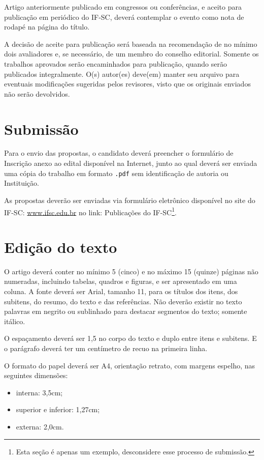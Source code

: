 \documentclass[12pt]{article}
\begin{document}
Artigo anteriormente publicado em congressos ou conferências, e aceito para publicação em periódico do IF-SC, deverá contemplar o evento como nota de rodapé na página do título. 

A decisão de aceite para publicação será baseada na recomendação de no mínimo dois avaliadores e, se necessário, de um membro do conselho editorial. Somente os trabalhos aprovados serão encaminhados para publicação, quando serão publicados integralmente. O(s) autor(es) deve(em) manter seu arquivo para eventuais modificações sugeridas pelos revisores, visto que os originais enviados não serão devolvidos. 

\section{Submissão}

Para o envio das propostas, o candidato deverá preencher o formulário de Inscrição anexo ao edital disponível na Internet, junto ao qual deverá ser enviada uma cópia do trabalho em formato \texttt{.pdf} sem identificação de autoria ou Instituição. 

As propostas deverão ser enviadas via formulário eletrônico disponível no site do IF-SC: \url{www.ifsc.edu.br} no link: Publicações do IF-SC\footnote{Esta seção é apenas um exemplo, desconsidere esse processo de submissão.}.


\section{Edição do texto}
O artigo deverá conter no mínimo 5 (cinco) e no máximo 15 (quinze) páginas não numeradas, incluindo tabelas, quadros e figuras, e ser apresentado em uma coluna. A fonte deverá ser Arial, tamanho 11, para os títulos dos itens, dos subitens, do resumo, do texto e das referências. Não deverão existir no texto palavras em negrito ou sublinhado para destacar segmentos do texto; somente itálico.  

O espaçamento deverá ser 1,5 no corpo do texto e duplo entre itens e subitens. E o parágrafo deverá ter um centímetro de recuo na primeira linha.

O formato do papel deverá ser A4, orientação retrato, com margens espelho, nas seguintes dimensões:

\begin{itemize}
	\item interna: 3,5cm;
	\item superior e inferior: 1,27cm;
	\item externa: 2,0cm.
\end{itemize}
\end{document}
